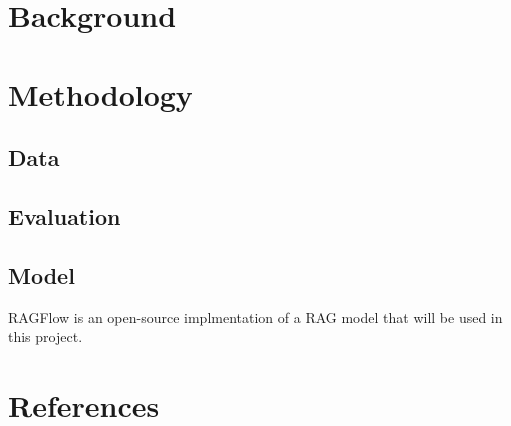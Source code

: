 \documentclass{article}
\begin{document}
\section{Background}

\section{Methodology}
\subsection{Data}

\subsection{Evaluation}

\subsection{Model}
RAGFlow is an open-source implmentation of a RAG model that will be used in this project. 

\section{References}
\end{document}
